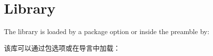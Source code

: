 \setcounter{section}{15}
\section{Library }\label{sec:raster}%
%
The library is loaded by a package option or inside the preamble by:

该库可以通过包选项或在导言中加载：
\begin{dispListing}
\end{dispListing}


% 
% 
% 
% 
% 


